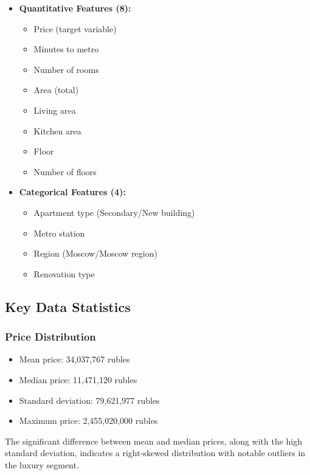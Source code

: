 \documentclass[12pt,a4paper]{report}
\begin{document}
\begin{itemize}
    \item \textbf{Quantitative Features (8):}
    \begin{itemize}
        \item Price (target variable)
        \item Minutes to metro
        \item Number of rooms
        \item Area (total)
        \item Living area
        \item Kitchen area
        \item Floor
        \item Number of floors
    \end{itemize}
    
    \item \textbf{Categorical Features (4):}
    \begin{itemize}
        \item Apartment type (Secondary/New building)
        \item Metro station
        \item Region (Moscow/Moscow region)
        \item Renovation type
    \end{itemize}
\end{itemize}

\subsection{Key Data Statistics}
\subsubsection{Price Distribution}
\begin{itemize}
    \item Mean price: 34,037,767 rubles
    \item Median price: 11,471,120 rubles
    \item Standard deviation: 79,621,977 rubles
    \item Maximum price: 2,455,020,000 rubles
\end{itemize}

The significant difference between mean and median prices, along with the high standard deviation, indicates a right-skewed distribution with notable outliers in the luxury segment.
\end{document}
